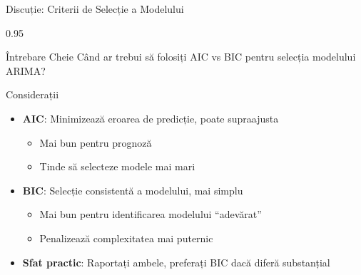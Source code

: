 \documentclass[9pt, aspectratio=169, t]{beamer}
\begin{document}
\begin{frame}{Discuție: Criterii de Selecție a Modelului}
    \begin{cminipage}{0.95\textwidth}
    \begin{block}{Întrebare Cheie}
        Când ar trebui să folosiți AIC vs BIC pentru selecția modelului ARIMA?
    \end{block}

    \vspace{0.3cm}

    \begin{block}{Considerații}
        \begin{itemize}\setlength{\itemsep}{0pt}
            \item \textbf{AIC}: Minimizează eroarea de predicție, poate supraajusta
                \begin{itemize}\setlength{\itemsep}{0pt}
                    \item Mai bun pentru prognoză
                    \item Tinde să selecteze modele mai mari
                \end{itemize}
            \item \textbf{BIC}: Selecție consistentă a modelului, mai simplu
                \begin{itemize}\setlength{\itemsep}{0pt}
                    \item Mai bun pentru identificarea modelului ``adevărat''
                    \item Penalizează complexitatea mai puternic
                \end{itemize}
            \item \textbf{Sfat practic}: Raportați ambele, preferați BIC dacă diferă substanțial
        \end{itemize}
    \end{block}
    \end{cminipage}
\end{frame}
\end{document}
